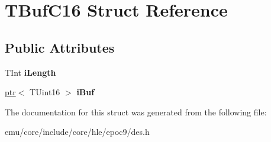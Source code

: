 \hypertarget{struct_t_buf_c16}{}\section{T\+Buf\+C16 Struct Reference}
\label{struct_t_buf_c16}
\subsection*{Public Attributes}
\begin{DoxyCompactItemize}
\item 
\mbox{\label{struct_t_buf_c16_ace98f57bad2aa1c22e76544ee94149ae}} 
T\+Int {\bfseries i\+Length}
\item 
\mbox{\label{struct_t_buf_c16_af90c9cb39e1fc576cdccbb3d4ca096fb}} 
\mbox{\hyperlink{classeka2l1_1_1ptr}{ptr}}$<$ T\+Uint16 $>$ {\bfseries i\+Buf}
\end{DoxyCompactItemize}


The documentation for this struct was generated from the following file\+:\begin{DoxyCompactItemize}
\item 
emu/core/include/core/hle/epoc9/des.\+h\end{DoxyCompactItemize}
